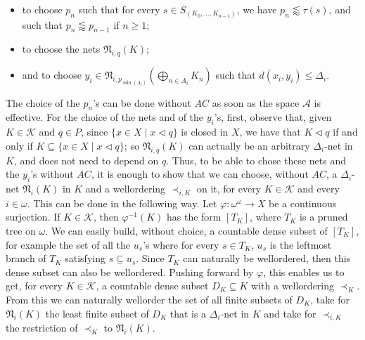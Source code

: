 \documentclass[a4paper,11pt]{article}
\theoremstyle{definition}
\numberwithin{equation}{section}
\newcommand{\K}{\mathcal{K}}
\begin{document}
\begin{itemize}

\item to choose $p_n$ such that for every $s \in S_{(K_0, \ldots, K_{n - 1})}$, we have $p_n \lessapprox \tau(s)$, and such that $p_n \lessapprox p_{n - 1}$ if $n \geqslant 1$;

\item to choose the nets $\mathfrak{N}_{i, q}(K)$;

\item and to choose $y_i \in \mathfrak{N}_{i, p_{\min(A_i)}}\left(\bigoplus_{n \in A_i} K_n\right)$ such that $d(x_i, y_i) \leqslant \Delta_i$.

\end{itemize}

The choice of the $p_n$'s can be done without $AC$ as soon as the space $\mathcal{A}$ is effective. For the choice of the nets and of the $y_i$'s, first, observe that, given $K \in \K$ and $q \in P$, since $\{x \in X \mid x \vartriangleleft q\}$ is closed in $X$, we have that $K \vartriangleleft q$ if and only if $K \subseteq \{x \in X \mid x \vartriangleleft q\}$; so $\mathfrak{N}_{i, q}(K)$ can actually be an arbitrary $\Delta_i$-net in $K$, and does not need to depend on $q$. Thus, to be able to chose these nets and the $y_i$'s without $AC$, it is enough to show that we can choose, without $AC$, a $\Delta_i$-net $\mathfrak{N}_i(K)$ in $K$ and a wellordering $\prec_{i, K}$ on it, for every $K \in \K$ and every $i \in \omega$. This can be done in the following way. Let $\varphi : \omega^\omega \rightarrow X$ be a continuous surjection. If $K \in \K$, then $\varphi^{- 1}(K)$ has the form $[T_K]$, where $T_K$ is a pruned tree on $\omega$. We can easily build, without choice, a countable dense subset of $[T_K]$, for example the set of all the $u_s$'s where for every $s \in T_K$, $u_s$ is the leftmost branch of $T_K$ satisfying $s \subseteq u_s$. Since $T_K$ can naturally be wellordered, then this dense subset can also be wellordered. Pushing forward by $\varphi$, this enables us to get, for every $K \in \K$, a countable dense subset $D_K \subseteq K$ with a wellordering $\prec_K$. From this we can naturally wellorder the set of all finite subsets of $D_K$, take for $\mathfrak{N}_i(K)$ the least finite subset of $D_K$ that is a $\Delta_i$-net in $K$ and take for $\prec_{i, K}$ the restriction of $\prec_K$ to $\mathfrak{N}_i(K)$.
\end{document}
